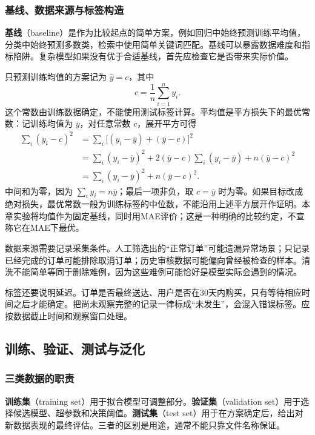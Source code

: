 \documentclass[UTF8,fontset=none,zihao=-4,a4paper]{ctexart}
\newcommand{\term}[1]{\textbf{#1}}
\numberwithin{equation}{section}
\numberwithin{figure}{section}
\begin{document}
\subsubsection{基线、数据来源与标签构造}
\term{基线}（baseline）是作为比较起点的简单方案，例如回归中始终预测训练平均值，分类中始终预测多数类，检索中使用简单关键词匹配。基线可以暴露数据难度和指标陷阱。复杂模型如果没有优于合适基线，首先应检查它是否带来实际价值。

只预测训练均值的方案记为 $\widehat y=c$，其中
\[
 c=\frac1n\sum_{i=1}^n y_i.
\]
这个常数由训练数据确定，不能使用测试标签计算。平均值是平方损失下的最优常数：记训练均值为 $\overline y$，对任意常数 $c$，展开平方可得
\begin{align*}
 \sum_i(y_i-c)^2
 &=\sum_i\bigl[(y_i-\overline y)+(\overline y-c)\bigr]^2\\
 &=\sum_i(y_i-\overline y)^2
 +2(\overline y-c)\sum_i(y_i-\overline y)
 +n(\overline y-c)^2\\
 &=\sum_i(y_i-\overline y)^2+n(\overline y-c)^2.
\end{align*}
中间和为零，因为 $\sum_i y_i=n\overline y$；最后一项非负，取 $c=\overline y$ 时为零。如果目标改成绝对损失，最优常数一般为训练标签的中位数，不能沿用上述平方展开作证明。本章实验将均值作为固定基线，同时用MAE评价；这是一种明确的比较约定，不宣称它在MAE下最优。

数据来源需要记录采集条件。人工筛选出的“正常订单”可能遗漏异常场景；只记录已经完成的订单可能排除取消订单；历史审核数据可能偏向曾经被检查的样本。清洗不能简单等同于删除难例，因为这些难例可能恰好是模型实际会遇到的情况。

标签还要说明延迟。订单是否最终送达、用户是否在30天内购买，只有等待相应时间之后才能确定。把尚未观察完整的记录一律标成“未发生”，会混入错误标签。应按数据截止时间和观察窗口处理。

\subsection{训练、验证、测试与泛化}
\subsubsection{三类数据的职责}
\term{训练集}（training set）用于拟合模型可调整部分。\term{验证集}（validation set）用于选择候选模型、超参数和决策阈值。\term{测试集}（test set）用于在方案确定后，给出对新数据表现的最终评估。三者的区别是用途，通常不能只靠文件名称保证。
\end{document}
